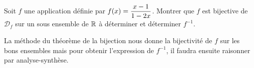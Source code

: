 \documentclass[a4paper, 11pt,reqno]{article}
\begin{document}
\begin{exercice}  \;
	Soit $f$ une application d\'efinie par $f(x)= \displaystyle\frac{x-1}{1-2x}$.
	Montrer que $f$ est bijective de $\mathcal{D}_f$ sur un sous ensemble de $\mathbb{R}$ \`{a} d\'eterminer et d\'eterminer $f^{-1}$.
\end{exercice}
\begin{correction} \;
	La m\'ethode du th\'eor\`{e}me de la bijection nous donne la bijectivit\'e de $f$ sur les bons ensembles mais pour obtenir l'expression de $f^{-1}$, il faudra ensuite raisonner par analyse-synth\`{e}se.

\end{correction}
\end{document}
